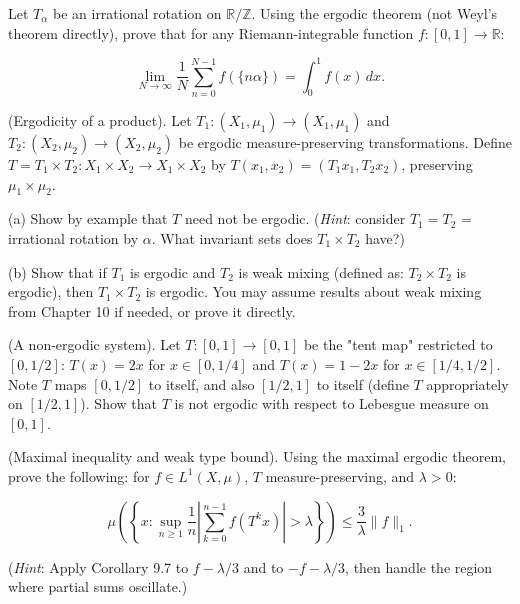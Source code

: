 \begin{exercise}
Let $T_\alpha$ be an irrational rotation on $\mathbb{R}/\mathbb{Z}$. Using the ergodic theorem (not Weyl's theorem directly), prove that for any Riemann-integrable function $f: [0,1] \to \mathbb{R}$:

\[
\lim_{N \to \infty} \frac{1}{N} \sum_{n=0}^{N-1} f(\{n\alpha\}) = \int_0^1 f(x) \, dx.
\]
\end{exercise}


\begin{exercise}
(Ergodicity of a product). Let $T_1: (X_1, \mu_1) \to (X_1, \mu_1)$ and $T_2: (X_2, \mu_2) \to (X_2, \mu_2)$ be ergodic measure-preserving transformations. Define $T = T_1 \times T_2: X_1 \times X_2 \to X_1 \times X_2$ by $T(x_1, x_2) = (T_1 x_1, T_2 x_2)$, preserving $\mu_1 \times \mu_2$.

(a) Show by example that $T$ need not be ergodic. (\textit{Hint}: consider $T_1 = T_2$ = irrational rotation by $\alpha$. What invariant sets does $T_1 \times T_2$ have?)

(b) Show that if $T_1$ is ergodic and $T_2$ is weak mixing (defined as: $T_2 \times T_2$ is ergodic), then $T_1 \times T_2$ is ergodic. You may assume results about weak mixing from Chapter 10 if needed, or prove it directly.
\end{exercise}


\begin{exercise}
(A non-ergodic system). Let $T: [0,1] \to [0,1]$ be the "tent map" restricted to $[0, 1/2]$: $T(x) = 2x$ for $x \in [0, 1/4]$ and $T(x) = 1 - 2x$ for $x \in [1/4, 1/2]$. Note $T$ maps $[0, 1/2]$ to itself, and also $[1/2, 1]$ to itself (define $T$ appropriately on $[1/2, 1]$). Show that $T$ is not ergodic with respect to Lebesgue measure on $[0,1]$.
\end{exercise}


\begin{exercise}
(Maximal inequality and weak type bound). Using the maximal ergodic theorem, prove the following: for $f \in L^1(X, \mu)$, $T$ measure-preserving, and $\lambda > 0$:

\[
\mu\left(\left\{x : \sup_{n \geq 1} \frac{1}{n}\left|\sum_{k=0}^{n-1} f(T^k x)\right| > \lambda \right\}\right) \leq \frac{3}{\lambda}\|f\|_1.
\]

(\textit{Hint}: Apply Corollary 9.7 to $f - \lambda/3$ and to $-f - \lambda/3$, then handle the region where partial sums oscillate.)
\end{exercise}


